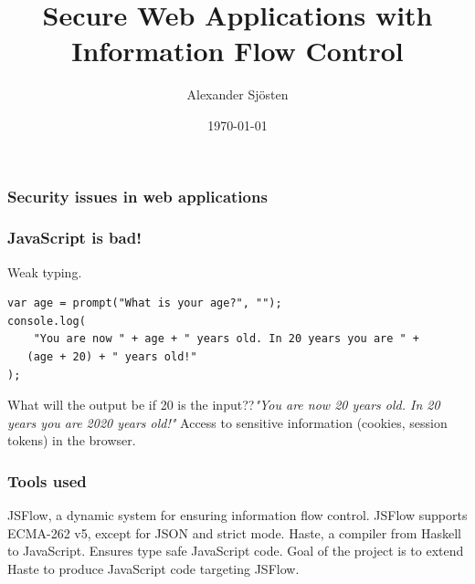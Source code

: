 \documentclass{beamer}
\title[SWAP-IFC]{Secure Web Applications with Information Flow Control}
\author{Alexander Sjösten}
\institute[GU]
{
Master's Thesis in Computer Science \\
\medskip
Examiner: Andrei Sabelfeld 
}
\date{\today}
\begin{document}
\begin{frame}
\titlepage
\end{frame}


\begin{frame}
  \frametitle{Security issues in web applications}
  
\end{frame}


\begin{frame}[fragile]
  \frametitle{JavaScript is bad!}
  Weak typing.
  \begin{block}{}
\begin{verbatim}
var age = prompt("What is your age?", "");
console.log(
    "You are now " + age + " years old. In 20 years you are " +
   (age + 20) + " years old!"
);
\end{verbatim}
  \end{block}
  What will the output be if 20 is the input??\pause \emph{"You are now 20 years old. In 20 years you are 2020 years old!"}
  \pause
  \newline
  Access to sensitive information (cookies, session tokens) in the browser. \pause
  
\end{frame}


\begin{frame}
  \frametitle{Tools used}
  JSFlow, a dynamic system for ensuring information flow control. \pause
  \newline
  JSFlow supports ECMA-262 v5, except for JSON and strict mode. \pause
  \newline
  \newline
  Haste, a compiler from Haskell to JavaScript. \pause
  \newline
  Ensures type safe JavaScript code. \pause
  \newline
  \newline
  Goal of the project is to extend Haste to produce JavaScript code targeting JSFlow.
\end{frame}
\end{document}
